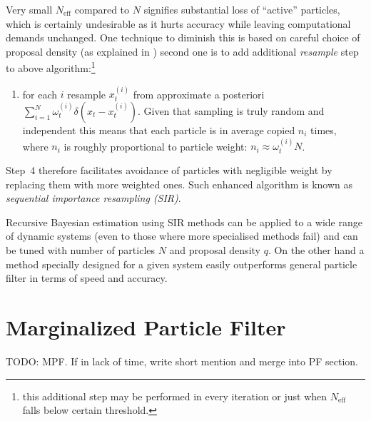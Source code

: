 Very small \(N_{\text{eff}}\) compared to \(N\) signifies substantial loss of ``active'' particles,
which is certainly undesirable as it hurts accuracy while leaving computational demands unchanged.
One technique to diminish this is based on careful choice of proposal density (as explained in
\cite{AruMasGor:02}) second one is to add additional \emph{resample} step to above
algorithm:\footnote{this additional step may be performed in every iteration or just when
\(N_{\text{eff}}\) falls below certain threshold.}
\begin{enumerate}[resume] %
	\item for each \(i\) resample \(x_t^{(i)}\) from approximate a posteriori {\pdf}
		\(\sum_{i=1}^N \omega_t^{(i)} \delta(x_t - x_t^{(i)})\). Given that sampling is truly random
		and independent this means that each particle is in average copied \(n_i\) times, where \(n_i\)
		is roughly proportional to particle weight: \(n_i \approx \omega_t^{(i)} N\).
\end{enumerate}

Step~4 therefore facilitates avoidance of particles with negligible weight by replacing them with more weighted
ones. Such enhanced algorithm is known as \emph{sequential importance resampling (SIR)}.

Recursive Bayesian estimation using SIR methods can be applied to a wide range of dynamic systems
(even to those where more specialised methods fail) and can be tuned with number of particles \(N\) and
proposal density \(q\). On the other hand a method specially designed for a given system easily
outperforms general particle filter in terms of speed and accuracy.

\section{Marginalized Particle Filter}

TODO: MPF. If in lack of time, write short mention and merge into PF section. %

